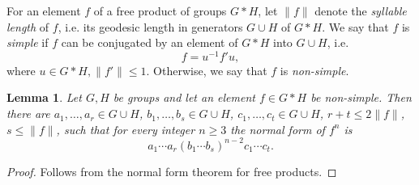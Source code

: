 \documentclass[10pt]{amsart}
\newtheorem{lemma}[theorem]{Lemma}
\theoremstyle{definition}
\def\dumb{simple} %
\def\nondumb{non-simple} %
\begin{document}
For an element $f$ of a free product of groups $G*H$, let $\|f\|$ denote the {\em syllable length} of $f$, i.e. its geodesic length in generators $G\cup H$ of $G*H$. We say that $f$ is {\em \dumb} if $f$ can be conjugated by an element of $G*H$ into $G\cup H$, i.e.
\begin{equation}\label{eq:simple}
f=u^{-1}f'u,
\end{equation}
where $u\in G*H, \|f'\|\le 1$. Otherwise, we say that $f$ is {\em \nondumb}.

\begin{lemma}\label{le:power}
Let $G,H$ be groups and let an element $f\in G\ast H$ be \nondumb.
Then there are $a_1,\ldots,a_r\in G\cup H$, $b_1,\ldots,b_s\in G\cup H$, $c_1,\ldots,c_t\in G\cup H$, $r+t\le 2\|f\|$, $s\le \|f\|$, such that for every integer $n\ge 3$ the normal form of $f^n$ is
$$
a_1\cdots a_r(b_1\cdots b_s)^{n-2}c_1\cdots c_t.
$$
\end{lemma}
\begin{proof} Follows from the normal form theorem for free products.
\end{proof}
\end{document}
